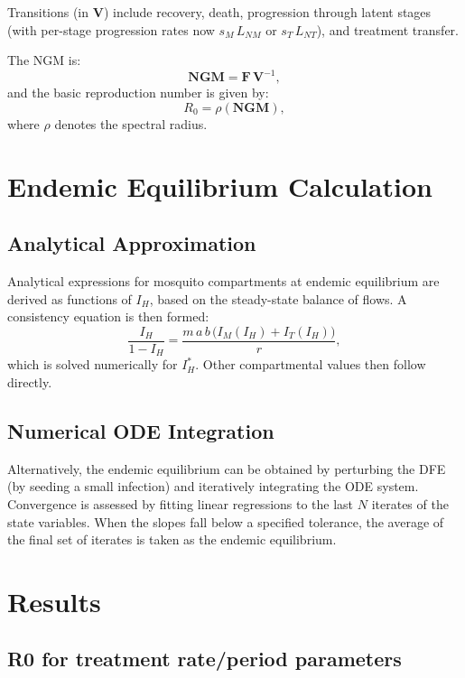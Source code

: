 \documentclass[12pt]{article}
\begin{document}
Transitions (in \(\mathbf{V}\)) include recovery, death, progression through latent stages (with per-stage progression rates now \(s_M \, L_{NM}\) or \(s_T \, L_{NT}\)), and treatment transfer.

The NGM is:
\[
\mathbf{NGM} = \mathbf{F}\,\mathbf{V}^{-1},
\]
and the basic reproduction number is given by:
\[
R_0 = \rho(\mathbf{NGM}),
\]
where \(\rho\) denotes the spectral radius.

\section{Endemic Equilibrium Calculation}

\subsection{Analytical Approximation}

Analytical expressions for mosquito compartments at endemic equilibrium are derived as functions of \(I_H\), based on the steady-state balance of flows. A consistency equation is then formed:
\[
\frac{I_H}{1-I_H} = \frac{m\,a\,b\,\bigl(I_M(I_H)+I_T(I_H)\bigr)}{r},
\]
which is solved numerically for \(I_H^*\). Other compartmental values then follow directly.

\subsection{Numerical ODE Integration}

Alternatively, the endemic equilibrium can be obtained by perturbing the DFE (by seeding a small infection) and iteratively integrating the ODE system. Convergence is assessed by fitting linear regressions to the last \(N\) iterates of the state variables. When the slopes fall below a specified tolerance, the average of the final set of iterates is taken as the endemic equilibrium.

\section{Results}

\subsection{R0 for treatment rate/period parameters}
\end{document}
